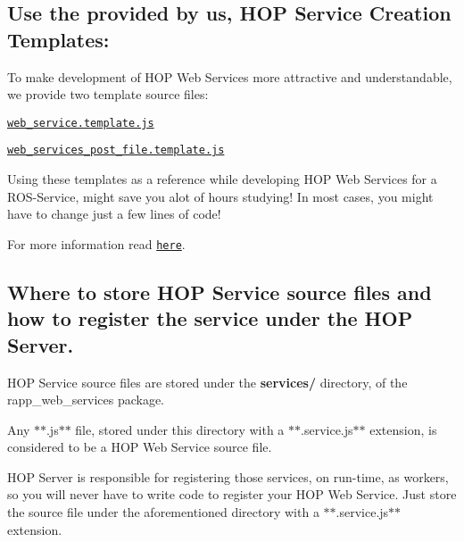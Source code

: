 \subsection*{Use the provided by us, H\-O\-P Service Creation Templates\-:}

To make development of H\-O\-P Web Services more attractive and understandable, we provide two template source files\-:


\begin{DoxyItemize}
\item \href{https://github.com/rapp-project/rapp-platform/tree/master/rapp_web_services/services/templates/web_service.template.js}{\tt web\-\_\-service.\-template.\-js}
\item \href{https://github.com/rapp-project/rapp-platform/blob/master/rapp_web_services/services/templates/web_service_post_file.template.js}{\tt web\-\_\-services\-\_\-post\-\_\-file.\-template.\-js}
\end{DoxyItemize}

Using these templates as a reference while developing H\-O\-P Web Services for a R\-O\-S-\/\-Service, might save you alot of hours studying! In most cases, you might have to change just a few lines of code!

For more information read \href{https://github.com/rapp-project/rapp-platform/tree/master/rapp_web_services/services/templates}{\tt here}.

\subsection*{Where to store H\-O\-P Service source files and how to register the service under the H\-O\-P Server.}

H\-O\-P Service source files are stored under the {\bfseries services/} directory, of the rapp\-\_\-web\-\_\-services package.

Any $\ast$$\ast$.js$\ast$$\ast$ file, stored under this directory with a $\ast$$\ast$.service.\-js$\ast$$\ast$ extension, is considered to be a H\-O\-P Web Service source file.

H\-O\-P Server is responsible for registering those services, on run-\/time, as workers, so you will never have to write code to register your H\-O\-P Web Service. Just store the source file under the aforementioned directory with a $\ast$$\ast$.service.\-js$\ast$$\ast$ extension. 